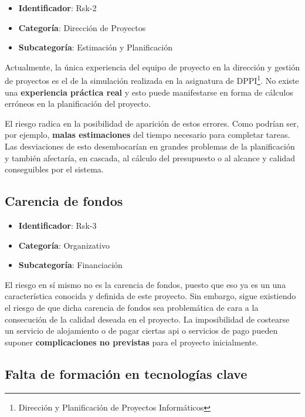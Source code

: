 \begin{itemize}
    \item \textbf{Identificador}: Rsk-2
    \item \textbf{Categoría}: Dirección de Proyectos
    \item \textbf{Subcategoría}: Estimación y Planificación
\end{itemize}

Actualmente, la única experiencia del equipo de proyecto en la dirección y gestión de proyectos es el de la simulación realizada en la asignatura de DPPI\footnote{Dirección y Planificación de Proyectos Informáticos}. No existe una \textbf{experiencia práctica real} y esto puede manifestarse en forma de cálculos erróneos en la planificación del proyecto.

El riesgo radica en la posibilidad de aparición de estos errores. Como podrían ser, por ejemplo, \textbf{malas estimaciones} del tiempo necesario para completar tareas. Las desviaciones de esto desembocarían en grandes problemas de la planificación y también afectaría, en cascada, al cálculo del presupuesto o al alcance y calidad conseguibles por el sistema.

\subsection{Carencia de fondos}

\begin{itemize}
    \item \textbf{Identificador}: Rsk-3
    \item \textbf{Categoría}: Organizativo
    \item \textbf{Subcategoría}: Financiación
\end{itemize}

El riesgo en sí mismo no es la carencia de fondos, puesto que eso ya es un una característica conocida y definida de este proyecto. Sin embargo, sigue existiendo el riesgo de que dicha carencia de fondos sea problemática de cara a la consecución de la calidad deseada en el proyecto. La imposibilidad de costearse un servicio de alojamiento o de pagar ciertas \acrshort{api} o servicios de pago pueden suponer \textbf{complicaciones no previstas} para el proyecto inicialmente.

\subsection{Falta de formación en tecnologías clave}

